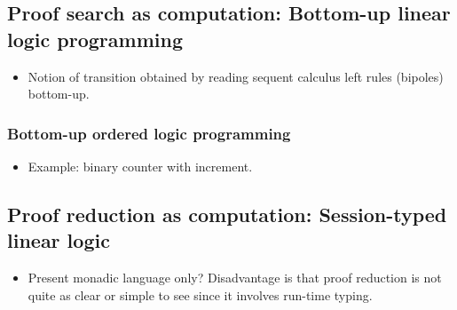 \subsection{Proof search as computation: Bottom-up linear logic programming}\label{sec:linear-lp}

\begin{itemize}
\item Notion of transition obtained by reading sequent calculus left rules  (bipoles) bottom-up.
\end{itemize}

\subsubsection{Bottom-up ordered logic programming}\label{sec:ordered-lp}

\begin{itemize}
\item Example: binary counter with increment.
\end{itemize}

\subsection{Proof reduction as computation: Session-typed linear logic}\label{sec:async-sill}

\begin{itemize}
\item Present monadic language only?  Disadvantage is that proof reduction is not quite as clear or simple to see since it involves run-time typing.
\end{itemize}

